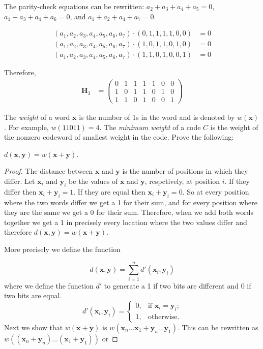 \documentclass[twoside]{amsart}
\begin{document}
\begin{enumerate}[A.]
   The parity-check equations can be rewritten: $a_2+a_3+a_4+a_5=0$,
   $a_1+a_3+a_4+a_6=0$, and $a_1+a_2+a_4+a_7=0$. 

   \begin{align*}
       (a_1,a_2,a_3,a_4,a_5,a_6,a_7)\cdot(0,1,1,1,1,0,0) &= 0\\
       (a_1,a_2,a_3,a_4,a_5,a_6,a_7)\cdot(1,0,1,1,0,1,0) &= 0\\
       (a_1,a_2,a_3,a_4,a_5,a_6,a_7)\cdot(1,1,0,1,0,0,1) &= 0
   \end{align*}
   
   Therefore,
   \begin{align*}
      \mathbf{H}_3 &= 
         \begin{pmatrix}
	    0 & 1 & 1 & 1 & 1 & 0 & 0 \\
	    1 & 0 & 1 & 1 & 0 & 1 & 0 \\
	    1 & 1 & 0 & 1 & 0 & 0 & 1
	 \end{pmatrix}
   \end{align*}

   \vspace{10pt}
   The \emph{weight} of a word $\mathbf{x}$ is the number of 1s in the
   word and is denoted by $w(\mathbf{x})$. For example,
   $w(11011)=4$. The \emph{minimum weight} of a code $C$ is the weight
   of the nonzero codeword of smallest weight in the code.
   Prove the following:

    $d(\mathbf{x},\mathbf{y})=w(\mathbf{x}+\mathbf{y})$.

   \noindent \begin{proof}
   The distance between $\mathbf{x}$ and $\mathbf{y}$ is the number of
   positions in which they differ. Let $\mathbf{x}_i$ and $\mathbf{y}_i$
   be the values of $\mathbf{x}$ and $\mathbf{y}$, respctively,
   at position $i$.
   If they differ then $\mathbf{x}_i + \mathbf{y}_i=1$. If they
   are equal then $\mathbf{x}_i + \mathbf{y}_i = 0$. So at every 
   position where the two words differ we get a 1 for their sum,
   and for every position where they are the same we get a 0 for their
   sum. Therefore, when we add both words together we get a 1
   in precisely every location where the two values differ and therefore
   $d(\mathbf{x},\mathbf{y})=w(\mathbf{x}+\mathbf{y})$.

   More precisely we define the function 

   \[
      d(\mathbf{x},\mathbf{y}) = \sum_{i=1}^{n}d'(\mathbf{x}_i,\mathbf{y}_i) \tag{Difference}
   \]
   where we define the function $d'$ to generate a 1 if two bits
   are different and 0 if two bits are equal.
   \[
      d'(\mathbf{x}_i,\mathbf{y}_i) = 
	 \begin{cases}
	    0,   &\text{if $\mathbf{x}_i = \mathbf{y}_i$;}\\
	    1,   &\text{otherwise.}
	 \end{cases}
   \]
   Next we show that $w(\mathbf{x}+\mathbf{y})$ is
   $w(\mathbf{x}_n\ldots\mathbf{x}_1 + \mathbf{y}_n\ldots\mathbf{y}_1)$.
   This can be rewritten as $w((\mathbf{x}_n+\mathbf{y}_n)\ldots
   (\mathbf{x}_1+\mathbf{y}_1))$ or


\end{proof}
\end{enumerate}
\end{document}
